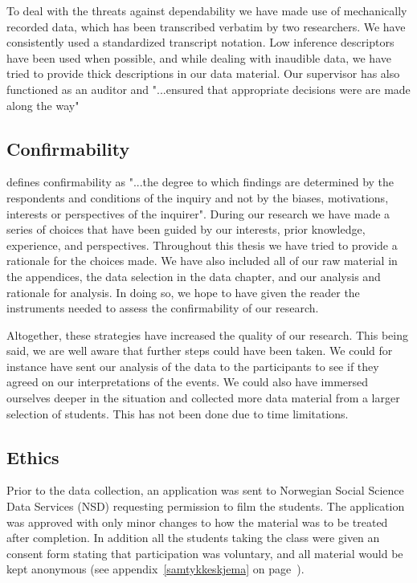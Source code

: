 To deal with the threats against dependability we have made use of mechanically recorded data, which has been transcribed verbatim by two researchers. We have consistently used a standardized transcript notation. Low inference descriptors have been used when possible, and while dealing with inaudible data, we have tried to provide thick descriptions in our data material. Our supervisor has also functioned as an auditor and "...ensured that appropriate decisions were are made along the way" \citep{baxter1997evaluating}

\subsection{Confirmability}
\citeauthor*{lincoln1985naturalistic} \citetext{\citeyear{lincoln1985naturalistic}, referenced in \citealp{baxter1997evaluating}, p. 517} defines confirmability as "...the degree to which findings are determined by the respondents and conditions of the inquiry and not by the biases, motivations, interests or perspectives of the inquirer". During our research we have made a series of choices that have been guided by our interests, prior knowledge, experience, and perspectives. Throughout this thesis we have tried to provide a rationale for the choices made. We have also included all of our raw material in the appendices, the data selection in the data chapter, and our analysis and rationale for analysis. In doing so, we hope to have given the reader the instruments needed to assess the confirmability of our research.  

Altogether, these strategies have increased the quality of our research. This being said, we are well aware that further steps could have been taken. We could for instance have sent our analysis of the data to the participants to see if they agreed on our interpretations of the events. We could also have immersed ourselves deeper in the situation and collected more data material from a larger selection of students. This has not been done due to time limitations. 

\subsection{Ethics}
Prior to the data collection, an application was sent to Norwegian Social Science Data Services (NSD) requesting permission to film the students. The application was approved with only minor changes to how the material was to be treated after completion. In addition all the students taking the class were given an consent form stating that participation was voluntary, and all material would be kept anonymous (see appendix~\ref{samtykkeskjema} on page~\pageref{samtykkeskjema}). 

